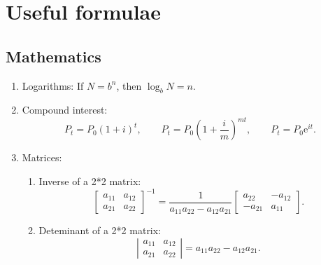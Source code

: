 \documentclass[a4paper,12pt]{article}
\begin{document}
\section{Useful formulae}

\subsection{Mathematics}

\begin{enumerate}
\item Logarithms: If $N=b^{n}$, then $\log _{b}N=n.$

\item Compound interest:%
\begin{equation*}
P_{t}=P_{0}\left( 1+i\right) ^{t},\qquad P_{t}=P_{0}\left( 1+\frac{i}{m}%
\right) ^{mt},\qquad P_{t}=P_{0}\mathrm{e}^{it}.
\end{equation*}

\item Matrices:

\begin{enumerate}
\item Inverse of a 2*2 matrix:
\begin{equation*}
\left[
\begin{array}{cc}
a_{11} & a_{12} \\
a_{21} & a_{22}%
\end{array}%
\right] ^{-1}=\frac{1}{a_{11}a_{22}-a_{12}a_{21}}\left[
\begin{array}{cc}
a_{22} & -a_{12} \\
-a_{21} & a_{11}%
\end{array}%
\right] .
\end{equation*}

\item Deteminant of a 2*2 matrix:
\begin{equation*}
\left\vert
\begin{array}{cc}
a_{11} & a_{12} \\
a_{21} & a_{22}%
\end{array}%
\right\vert =a_{11}a_{22}-a_{12}a_{21}.
\end{equation*}


\end{enumerate}
\end{enumerate}
\end{document}
